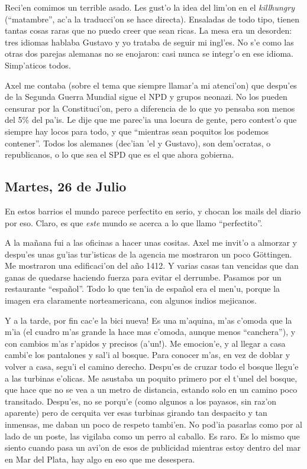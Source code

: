 Reci'en comimos un terrible asado. Les gust'o la idea del lim'on en el
\emph{killhungry} (``matambre'', ac'a la traducci'on se hace directa).
Ensaladas de todo tipo, tienen tantas cosas raras que no puedo creer que sean
ricas. La mesa era un desorden: tres idiomas hablaba Gustavo y yo trataba de
seguir mi ingl'es. No s'e como las otras dos parejas alemanas no se enojaron:
casi nunca se integr'o en ese idioma. Simp'aticos todos.

Axel me contaba (sobre el tema que siempre llamar'a mi atenci'on) que despu'es
de la Segunda Guerra Mundial sigue el {\small NPD} y grupos neonazi. No los
pueden censurar por la Constituci'on, pero a diferencia de lo que yo pensaba son
menos del 5\% del pa'is. Le dije que me parec'ia una locura de gente, pero
contest'o que siempre hay locos para todo, y que ``mientras sean poquitos los
podemos contener''. Todos los alemanes (dec'ian 'el y Gustavo), son dem'ocratas,
o republicanos, o lo que sea el {\small SPD} que es el que ahora gobierna.

\subsection*{Martes, 26 de Julio}

En estos barrios el mundo parece perfectito en serio, y chocan los mails del
diario por eso. Claro, es que \emph{este} mundo se acerca a lo que llamo
``perfectito''.

A la ma\~nana fui a las oficinas a hacer unas cositas. Axel me invit'o a
almorzar y despu'es unas gu'ias tur'isticas de la agencia me mostraron un poco
G\"ottingen. Me mostraron una edificaci'on del a\~no 1412. Y varias casas tan
vencidas que dan ganas de quedarse haciendo fuerza para evitar el derrumbe.
Pasamos por un restaurante ``espa\~nol''. Todo lo que ten'ia de espa\~nol era el
men'u, porque la imagen era claramente norteamericana, con algunos indios
mejicanos.

Y a la tarde, \textexclamdown por fin cac'e la bici nueva! Es una m'aquina, m'as
c'omoda que la m'ia (el cuadro m'as grande la hace mas c'omoda, aunque menos
``canchera''), y con cambios m'as r'apidos y precisos (\textexclamdown a'un!).
Me emocion'e, y al llegar a casa cambi'e los pantalones y sal'i al bosque. Para
conocer m'as, en vez de doblar y volver a casa, segu'i el camino derecho.
Despu'es de cruzar todo el bosque llegu'e a las turbinas e'olicas. Me asustaba
un poquito primero por el t'unel del bosque, que hace que no se vea a un metro
de distancia, estando solo en un camino poco transitado. Despu'es, no se porqu'e
(como algunos a los payasos, sin raz'on aparente) pero de cerquita ver esas
turbinas girando tan despacito y tan inmensas, me daban un poco de respeto
tambi'en. No pod'ia pasarlas como por al lado de un poste, las vigilaba como un
perro al caballo. Es raro. Es lo mismo que siento cuando pasa un avi'on de esos
de publicidad mientras estoy dentro del mar en Mar del Plata, hay algo en eso
que me desespera.

